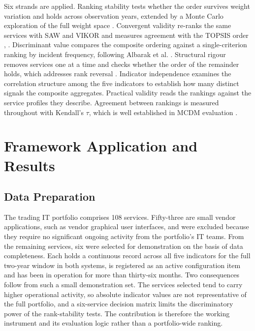 \documentclass[
  journal,
]{IEEEtran}%
\begin{document}
Six strands are applied. Ranking stability tests whether the order
survives weight variation and holds across observation years, extended
by a Monte Carlo exploration of the full weight space
.
Convergent validity re-ranks the same services with SAW and VIKOR and
measures agreement with the TOPSIS order
,
.
Discriminant value compares the composite ordering against a
single-criterion ranking by incident frequency, following Albarak et al.
. Structural
rigour removes services one at a time and checks whether the order of
the remainder holds, which addresses rank reversal
.
Indicator independence examines the correlation structure among the five
indicators to establish how many distinct signals the composite
aggregates. Practical validity reads the rankings against the service
profiles they describe. Agreement between rankings is measured
throughout with Kendall's \(\tau\), which is well established in MCDM
evaluation .

\section{Framework Application and Results}\label{sec-results}

\subsection{Data Preparation}\label{data-preparation}

The trading IT portfolio comprises 108 services. Fifty-three are small
vendor applications, such as vendor graphical user interfaces, and were
excluded because they require no significant ongoing activity from the
portfolio's IT teams. From the remaining services, six were selected for
demonstration on the basis of data completeness. Each holds a continuous
record across all five indicators for the full two-year window in both
systems, is registered as an active configuration item and has been in
operation for more than thirty-six months. Two consequences follow from
such a small demonstration set. The services selected tend to carry
higher operational activity, so absolute indicator values are not
representative of the full portfolio, and a six-service decision matrix
limits the discriminatory power of the rank-stability tests. The
contribution is therefore the working instrument and its evaluation
logic rather than a portfolio-wide ranking.
\end{document}
